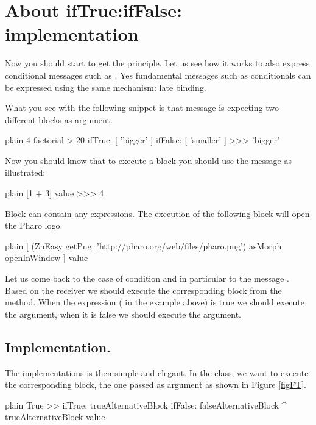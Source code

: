 \documentclass[10pt,twoside,english]{_support/latex/sbabook/sbabook}
\begin{document}
\section{About ifTrue:ifFalse: implementation}
Now you should start to get the principle. Let us see how it works to also express conditional messages such as . Yes fundamental messages such as conditionals can be expressed using the same mechanism: late binding.

What you see with the following snippet is that message  is expecting two different blocks as argument. 

\begin{displaycode}{plain}
4 factorial > 20
	ifTrue: [ 'bigger' ]
	ifFalse: [ 'smaller' ]
>>> 'bigger'
\end{displaycode}

Now you should know that to execute a block you should use the message  as illustrated:

\begin{displaycode}{plain}
[1 + 3] value
>>> 4
\end{displaycode}

Block can contain any expressions. The execution of the following block will open the Pharo logo.

\begin{displaycode}{plain}
[ (ZnEasy getPng: 'http://pharo.org/web/files/pharo.png')
       asMorph openInWindow ] value
\end{displaycode}

Let us come back to the case of condition and in particular to the message .
Based on the receiver we should execute the corresponding block from the  method. When the expression ( in the example above) is true we should execute the  argument, when it is false we should execute the  argument. 
\subsection{Implementation. }
The implementations is then simple and elegant.  In the  class, we want to execute the corresponding block, 
the one passed as  argument as shown in Figure \ref{figFT}. 

\begin{displaycode}{plain}
True >> ifTrue: trueAlternativeBlock ifFalse: falseAlternativeBlock
   ^ trueAlternativeBlock value
\end{displaycode}
\end{document}
